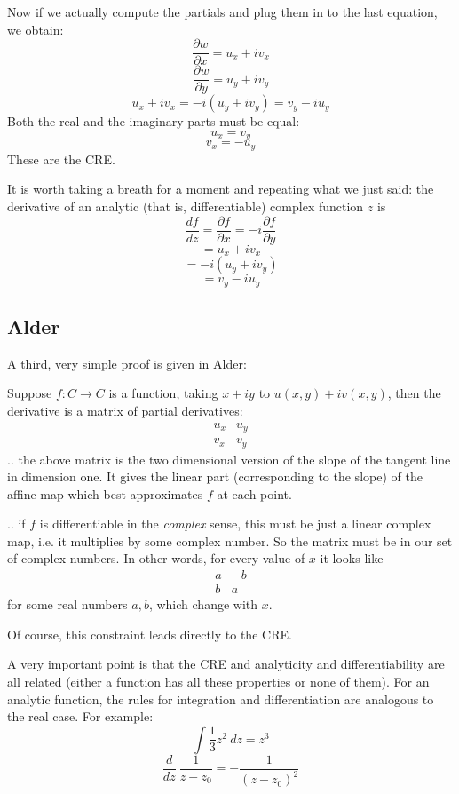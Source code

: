 \documentclass[11pt, oneside]{article}   	%
\begin{document}
Now if we actually compute the partials and plug them in to the last equation, we obtain:
\[ \frac{\partial w}{\partial x} = u_x + i v_x \]
\[ \frac{\partial w}{\partial y} = u_y + i v_y \]
\[ u_x + i v_x = -i (u_y + i v_y) = v_y - i u_y \]
Both the real and the imaginary parts must be equal:
\[ u_x = v_y \]
\[ v_x = - u_y \]
These are the CRE.

It is worth taking a breath for a moment and repeating what we just said:  the derivative of an analytic (that is, differentiable) complex function $z$ is
\[ \frac{df}{dz} = \frac{\partial f}{\partial x} = - i \frac{\partial f}{\partial y} \]
\[ = u_x + i v_x \]
\[ = -i (u_y + i v_y) \]
\[ = v_y - i u_y\] 

\subsection*{Alder}
A third, very simple proof is given in Alder:

Suppose $f: C \rightarrow C$ is a function, taking $x+iy$ to $u(x,y) + iv(x,y)$, then the derivative is a matrix of partial derivatives:
\[
\begin{matrix}
u_x &  u_y \\
v_x & v_y
\end{matrix}
\]
.. the above matrix is the two dimensional version of the slope of the tangent line in dimension one.  It gives the linear part (corresponding to the slope) of the affine map which best approximates $f$ at each point.

.. if $f$ is differentiable in the \emph{complex} sense, this must be just a linear complex map, i.e. it multiplies by some complex number.  So the matrix must be in our set of complex numbers.  In other words, for every value of $x$ it looks like
\[
\begin{matrix}
a & -b \\
b & a
\end{matrix}
\]
for some real numbers $a,b$, which change with $x$.

Of course, this constraint leads directly to the CRE.

A very important point is that the CRE and analyticity and differentiability are all related  (either a function has all these properties or none of them).  For an analytic function, the rules for integration and differentiation are analogous to the real case.  For example:
\[ \int \frac{1}{3} z^2 \ dz = z^3 \]
\[ \frac{d}{dz} \ \frac{1}{z - z_0} = - \frac{1}{(z-z_0)^2} \]
\end{document}
